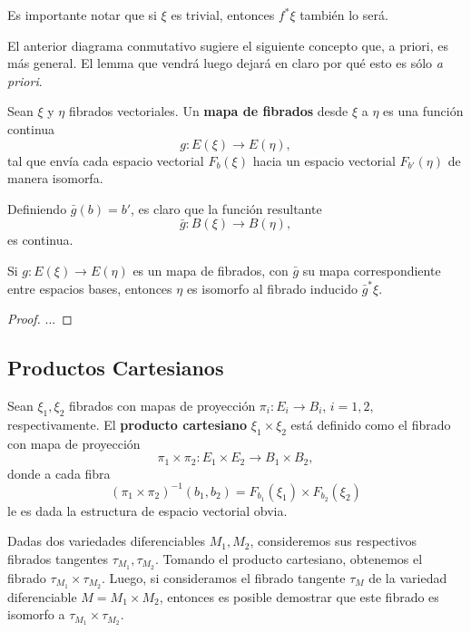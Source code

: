 Es importante notar que si $\xi$ es trivial, entonces $f^{*}\xi$ también lo será. \par
El anterior diagrama conmutativo sugiere el siguiente concepto que, a priori, es más general. El lemma que vendrá luego dejará en claro por qué esto es sólo \textit{a priori}.

\begin{definition}
	Sean $\xi$ y $\eta$ fibrados vectoriales. Un \textbf{mapa de fibrados} desde $\xi$ a $\eta$ es una función continua
	\[ g \colon E(\xi) \to E(\eta), \]
	tal que envía cada espacio vectorial $F_{b}(\xi)$ hacia un espacio vectorial $F_{b'}(\eta)$ de manera isomorfa.
\end{definition}

Definiendo $\bar{g}(b) = b'$, es claro que la función resultante
\[ \bar{g} \colon B(\xi) \to B(\eta), \]
es continua.

\begin{lemma}
	Si $g \colon E(\xi) \to E(\eta)$ es un mapa de fibrados, con $\bar{g}$ su mapa correspondiente entre espacios bases, entonces $\eta$ es isomorfo al fibrado inducido $\bar{g}^{*}\xi$.
\end{lemma}
\begin{proof}
	...
\end{proof}

\subsection{Productos Cartesianos}

Sean $\xi_{1},\xi_{2}$ fibrados con mapas de proyección $\pi_{i} \colon E_{i} \to B_{i}$, $i=1,2$, respectivamente. El \textbf{producto cartesiano} $\xi_{1} \times \xi_{2}$ está definido como el fibrado con mapa de proyección
\[ \pi_{1} \times \pi_{2} \colon E_{1} \times E_{2} \to B_{1} \times B_{2}, \]
donde a cada fibra
\[ (\pi_{1} \times \pi_{2})^{-1}(b_{1},b_{2}) = F_{b_{1}}(\xi_{1}) \times F_{b_{2}}(\xi_{2}) \]
le es dada la estructura de espacio vectorial obvia.

\begin{example}
	Dadas dos variedades diferenciables $M_{1},M_{2}$, consideremos sus respectivos fibrados tangentes $\tau_{M_{1}}, \tau_{M_{2}}$. Tomando el producto cartesiano, obtenemos el fibrado $\tau_{M_{1}} \times \tau_{M_{2}}$. Luego, si consideramos el fibrado tangente $\tau_{M}$ de la variedad diferenciable $M = M_{1} \times M_{2}$, entonces es posible demostrar que este fibrado es isomorfo a $\tau_{M_{1}} \times \tau_{M_{2}}$.
\end{example}

